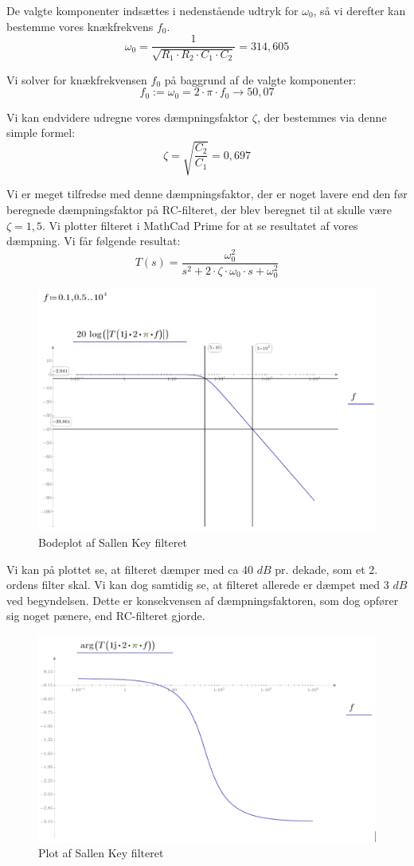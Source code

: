 De valgte komponenter indsættes i nedenstående udtryk for $ \omega_{0} $, så vi derefter kan bestemme vores knækfrekvens $ f_{0} $.
\[ \omega_{0}=\frac{1}{\sqrt{R_{1} \cdot R_{2} \cdot C_{1} \cdot C_{2}}}=314,605 \]

Vi solver for knækfrekvensen $ f_{0} $ på baggrund af de valgte komponenter:
\[ f_{0}:=\omega_{0}=2\cdot \pi \cdot f_{0} \rightarrow 50,07 \]

Vi kan endvidere udregne vores dæmpningsfaktor $ \zeta $, der bestemmes via denne simple formel: 
\[ \zeta=\sqrt{\frac{C_{2}}{C_{1}}}=0,697 \]

Vi er meget tilfredse med denne dæmpningsfaktor, der er noget lavere end den før beregnede dæmpningsfaktor på RC-filteret, der blev beregnet til at skulle være $ \zeta = 1,5 $. Vi plotter filteret i MathCad Prime for at se resultatet af vores dæmpning. Vi får følgende resultat:
\[ T(s)=\frac{\omega_{0}^{2}}{{s^{2}+2 \cdot \zeta \cdot \omega_{0}\cdot s+\omega_{0}^{2}}} \]

\begin{figure}[h!]
	\centering
	\includegraphics[width=0.5\linewidth]{Hardware/Filterplot1}
	\caption{Bodeplot af Sallen Key filteret}
	\label{fig:Filterplot1}
\end{figure}

Vi kan på plottet se, at filteret dæmper med ca 40 $ dB $ pr. dekade, som et 2. ordens filter skal. Vi kan dog samtidig se, at filteret allerede er dæmpet med 3 $ dB $ ved begyndelsen. Dette er konsekvensen af dæmpningsfaktoren, som dog opfører sig noget pænere, end RC-filteret gjorde. 

\clearpage

\begin{figure}[h!]
	\centering
	\includegraphics[width=0.5\linewidth]{Hardware/Filterplot2}
	\caption{Plot af Sallen Key filteret}
	\label{fig:Filterplot2}
\end{figure}

